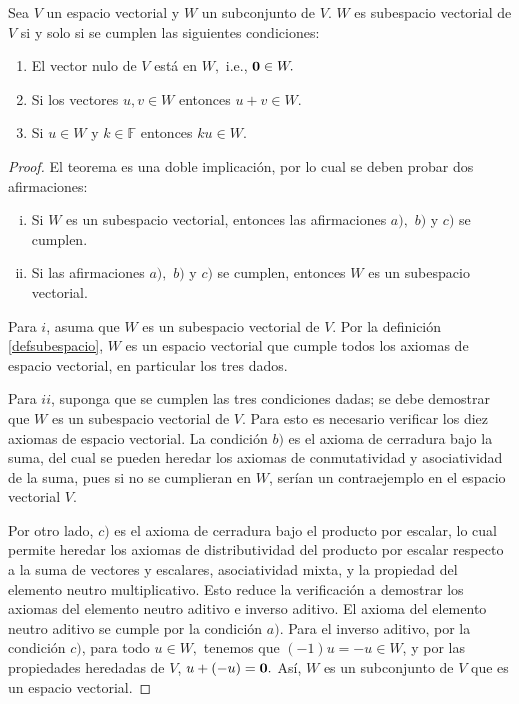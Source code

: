 \begin{theorem}\label{testsubespacio} Sea $V$ un espacio vectorial y $W$ un subconjunto de $V$. $W$ es subespacio vectorial de $V$ si y solo si se cumplen las siguientes condiciones:
\begin{enumerate}[$a)$]
\item El vector nulo de $V$ está en $W,$ i.e., ${\bf{0}}\in W.$
\item Si los vectores $u,v\in W$ entonces $u+v\in W.$
\item Si $u\in W$ y $k\in \mathbb{F}$ entonces $ku\in W.$
\end{enumerate}
\begin{proof}
El teorema es una doble implicación, por lo cual se deben probar dos afirmaciones: 
\begin{enumerate}[i.]
\item Si $W$ es un subespacio vectorial, entonces las afirmaciones $a),$ $b)$ y $c)$ se cumplen. 
\item Si las afirmaciones $a),$ $b)$ y $c)$ se cumplen, entonces $W$ es un subespacio vectorial. \end{enumerate}
Para $i$, asuma que $W$ es un subespacio vectorial de $V$. Por la definición \ref{defsubespacio}, $W$ es un espacio vectorial que cumple todos los axiomas de espacio vectorial, en particular los tres dados.

Para $ii$, suponga que se cumplen las tres condiciones dadas; se debe demostrar que $W$ es un subespacio vectorial de $V.$ Para esto es necesario verificar los diez axiomas de espacio vectorial. La condición $b)$ es el axioma de cerradura bajo la suma, del cual se pueden heredar los axiomas de conmutatividad y asociatividad de la suma, pues si no se cumplieran en $W$, serían un contraejemplo en el espacio vectorial $V.$ 

Por otro lado, $c)$ es el axioma de cerradura bajo el producto por escalar, lo cual permite heredar los axiomas de distributividad del producto por escalar respecto a la suma de vectores y escalares, asociatividad mixta, y la propiedad del elemento neutro multiplicativo. Esto reduce la verificación a demostrar los axiomas del elemento neutro aditivo e inverso aditivo. El axioma del elemento neutro aditivo se cumple por la condición $a)$. Para el inverso aditivo, por la condición $c)$, para todo $u\in W,$ tenemos que $(-1)u = -u\in W$, y por las propiedades heredadas de $V$, $u+(-u)=\bf{0}.$ Así, $W$ es un subconjunto de $V$ que es un espacio vectorial. 
\end{proof}

\end{theorem}


